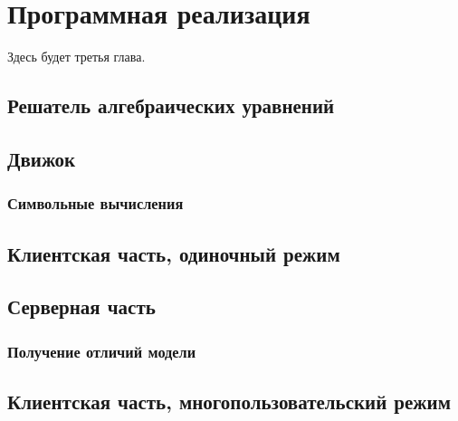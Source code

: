 \chapter{Программная реализация}

Здесь будет третья глава. \TODO

\section{Решатель алгебраических уравнений}

\TODO

\section{Движок}\label{engine}

\TODO

\subsection{Символьные вычисления}\label{expr}

\TODO

\section{Клиентская часть, одиночный режим}

\TODO

\section{Серверная часть}

\subsection{Получение отличий модели}\label{model-diff-implementation}

\TODO

\section{Клиентская часть, многопользовательский режим}

\TODO
